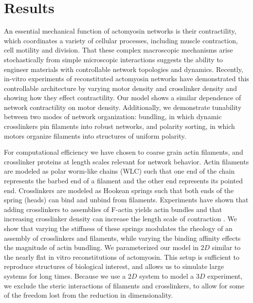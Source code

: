 \documentclass[12pt]{article}
\begin{document}
\section{Results}
An essential mechanical function of actomyosin networks is their contractility, 
which coordinates a variety of cellular processes, including muscle contraction,
cell motility and division. That these complex macroscopic mechanisms arise 
stochastically from simple microscopic interactions suggests the ability
to engineer materials with controllable network topologies and dynamics. 
Recently, in-vitro experiments of reconstituted actomyosin networks have 
demonstrated this controllable architecture by varying motor density and
crosslinker density and showing how they effect contractility\cite{murrell2012, murrell2014}. 
Our model shows a similar dependence of network contractility on motor density. 
Additionally, we demonstrate tunability between two modes  of network 
organization: bundling, in which dynamic crosslinkers pin filaments into robust 
networks, and polarity sorting, in which motors organize filaments into 
structures of uniform polarity.
\par
For computational efficiency we have chosen to coarse grain actin filaments, and
crosslinker proteins at length scales relevant for network behavior. Actin 
filaments are modeled as polar worm-like chains (WLC) such that one end of the 
chain represents the barbed end of a filament and the other end represents its 
pointed end. Crosslinkers are modeled as Hookean springs such that both ends of 
the spring (heads) can bind and unbind from filaments. Experiments have shown 
that adding crosslinkers to assemblies of F-actin yields actin bundles 
\cite{gardel2004, murrell2012, murrell2014} and that increasing crosslinker 
density can increase the length scale of contraction \cite{murrell2012}. 
We show that varying the stiffness of these springs modulates the rheology 
of an assembly of crosslinkers and filaments, while varying the binding affinity
effects the magnitude of actin bundling. We parameterized our model in $2D$ 
similar to the nearly flat in vitro reconstitutions of actomyosin. This setup is
sufficient to reproduce structures of biological interest, and allows us to 
simulate large systems for long times. Because we use a $2D$ system to model a 
$3D$ experiment, we exclude the steric interactions of filaments and 
crosslinkers, to allow for some of the freedom lost from the reduction in 
dimensionality.
\end{document}
